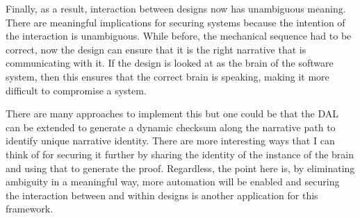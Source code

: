Finally, as a result, interaction between designs now has unambiguous meaning. There are meaningful implications for securing systems because the intention of the interaction is unambiguous. While before, the mechanical sequence had to be correct, now the design can ensure that it is the right narrative that is communicating with it. If the design is looked at as the brain of the software system, then this ensures that the correct brain is speaking, making it more difficult to compromise a system.

There are many approaches to implement this but one could be that the DAL can be extended to generate a dynamic checksum along the narrative path to identify unique narrative identity. There are more interesting ways that I can think of for securing it further by sharing the identity of the instance of the brain and using that to generate the proof. Regardless, the point here is, by eliminating ambiguity in a meaningful way, more automation will be enabled and securing the interaction between and within designs is another application for this framework.